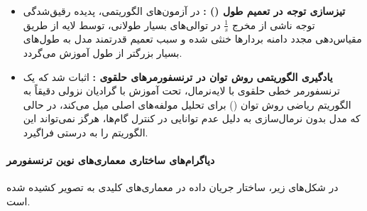 \begin{itemize}
    \item \textbf{تیزسازی توجه در تعمیم طول () \cite{zsamboki2026postnorm}:} در آزمون‌های الگوریتمی، پدیده رقیق‌شدگی توجه ناشی از مخرج $\frac{1}{s}$ در توالی‌های بسیار طولانی، توسط لایه  از طریق مقیاس‌دهی مجدد دامنه بردارها خنثی شده و سبب تعمیم قدرتمند مدل به طول‌های بسیار بزرگتر از طول آموزش می‌گردد.
    \item \textbf{یادگیری الگوریتمی روش توان در ترنسفورمرهای حلقوی \cite{wu2026looped}:} اثبات شد که یک ترنسفورمر خطی حلقوی با لایه‌نرمال، تحت آموزش با گرادیان نزولی دقیقاً به الگوریتم ریاضی روش توان () برای تحلیل مولفه‌های اصلی میل می‌کند، در حالی که مدل بدون نرمال‌سازی به دلیل عدم توانایی در کنترل گام‌ها، هرگز نمی‌تواند این الگوریتم را به درستی فراگیرد.
\end{itemize}

\paragraph*{دیاگرام‌های ساختاری معماری‌های نوین ترنسفورمر}
در شکل‌های زیر، ساختار جریان داده در معماری‌های کلیدی به تصویر کشیده شده است.

